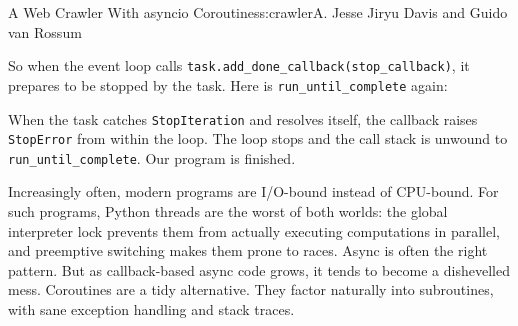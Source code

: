 \begin{aosachapter}{A Web Crawler With asyncio Coroutines}{s:crawler}{A. Jesse Jiryu Davis and Guido van Rossum}
\begin{Shaded}
\begin{Highlighting}[]
     
        \NormalTok{:}
         
           


\end{Highlighting}
\end{Shaded}

So when the event loop calls
\texttt{task.add\_done\_callback(stop\_callback)}, it prepares to be
stopped by the task. Here is \texttt{run\_until\_complete} again:

\begin{Shaded}
\begin{Highlighting}[]
     
        \NormalTok{:}
         
\end{Highlighting}
\end{Shaded}

When the task catches \texttt{StopIteration} and resolves itself, the
callback raises \texttt{StopError} from within the loop. The loop stops
and the call stack is unwound to \texttt{run\_until\_complete}. Our
program is finished.

\label{conclusion}

Increasingly often, modern programs are I/O-bound instead of CPU-bound.
For such programs, Python threads are the worst of both worlds: the
global interpreter lock prevents them from actually executing
computations in parallel, and preemptive switching makes them prone to
races. Async is often the right pattern. But as callback-based async
code grows, it tends to become a dishevelled mess. Coroutines are a tidy
alternative. They factor naturally into subroutines, with sane exception
handling and stack traces.


\end{aosachapter}
